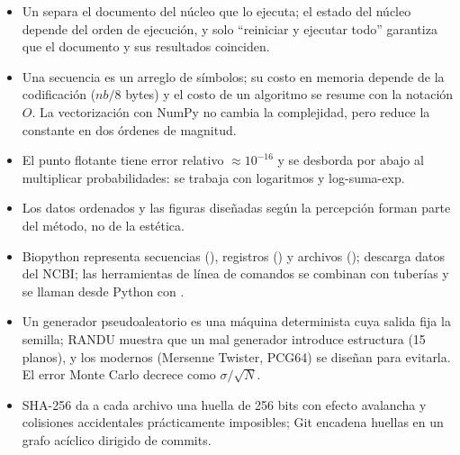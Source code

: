 \begin{resumen}
\begin{itemize}
  \item Un  separa el documento del núcleo que lo ejecuta; el estado del núcleo depende del orden de ejecución, y solo ``reiniciar y ejecutar todo'' garantiza que el documento y sus resultados coinciden.
  \item Una secuencia es un arreglo de símbolos; su costo en memoria depende de la codificación ($n b/8$ bytes) y el costo de un algoritmo se resume con la notación $O$. La vectorización con NumPy no cambia la complejidad, pero reduce la constante en dos órdenes de magnitud.
  \item El punto flotante tiene error relativo $\approx10^{-16}$ y se desborda por abajo al multiplicar probabilidades: se trabaja con logaritmos y log-suma-exp.
  \item Los datos ordenados y las figuras diseñadas según la percepción forman parte del método, no de la estética.
  \item Biopython representa secuencias (), registros () y archivos ();  descarga datos del NCBI; las herramientas de línea de comandos se combinan con tuberías y se llaman desde Python con .
  \item Un generador pseudoaleatorio es una máquina determinista cuya salida fija la semilla; RANDU muestra que un mal generador introduce estructura (15 planos), y los modernos (Mersenne Twister, PCG64) se diseñan para evitarla. El error Monte Carlo decrece como $\sigma/\sqrt N$.
  \item SHA-256 da a cada archivo una huella de 256 bits con efecto avalancha y colisiones accidentales prácticamente imposibles; Git encadena huellas en un grafo acíclico dirigido de commits.
\end{itemize}
\end{resumen}

